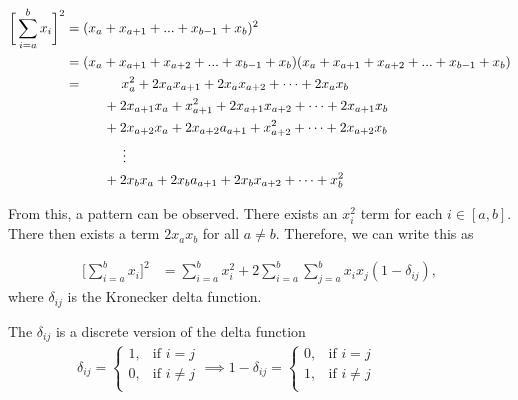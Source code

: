 \begin{align}
	\bigg[\sum_{i=a}^{b} x_i\bigg]^2 &= (x_a +  x_{a+1} + ... + x_{b-1} + x_b)^2 \\
	&= (x_a +  x_{a+1} + x_{a+2} + ... + x_{b-1} + x_b)(x_a +  x_{a+1} + x_{a+2} + ... + x_{b-1} + x_b) \\
	&= \hspace{1cm} x_a^2 + 2x_ax_{a+1} + 2x_ax_{a+2} + \cdots + 2x_ax_b \nonumber\\
	& \hspace{1cm}+ 2x_{a+1}x_{a} + x_{a+1}^2 + 2x_{a+1}x_{a+2} + \cdots + 2x_{a+1}x_b \nonumber\\
	& \hspace{1cm}+ 2x_{a+2}x_{a} + 2x_{a+2}a_{a+1} + x_{a+2}^2 + \cdots + 2x_{a+2}x_b \nonumber\\
	& \hspace{1.5cm} \vdots \nonumber\\
	& \hspace{1cm}+ 2x_{b}x_{a} + 2x_{b}a_{a+1} + 2x_{b}x_{a+2} + \cdots + x_b^2	
\end{align}

From this, a pattern can be observed. There exists an $x_i^2$ term for each $i \in [a,b]$. There then exists a term $2x_ax_b$ for  all $a \neq b$. Therefore, we can write this as

\begin{align}
	\bigg[\sum_{i=a}^{b} x_i\bigg]^2 &= \sum_{i=a}^{b} x_i^2 + 2\sum_{i=a}^{b}\sum_{j=a}^{b} x_ix_j (1-\delta_{ij}),
\end{align}
where $\delta_{ij}$ is the Kronecker delta function.
\begin{defn}
	The  $\delta_{ij}$ is a discrete version of the delta function
	\begin{align}
		\delta_{ij} = \begin{cases}
			1, & \text{if } i = j \\
			0, & \text{if } i \neq j \\
		\end{cases}  \implies 1-\delta_{ij} = \begin{cases}
		0, & \text{if } i = j \\
		1, & \text{if } i \neq j \\
		\end{cases} \hspace{2cm}
	\end{align}
\end{defn}



















